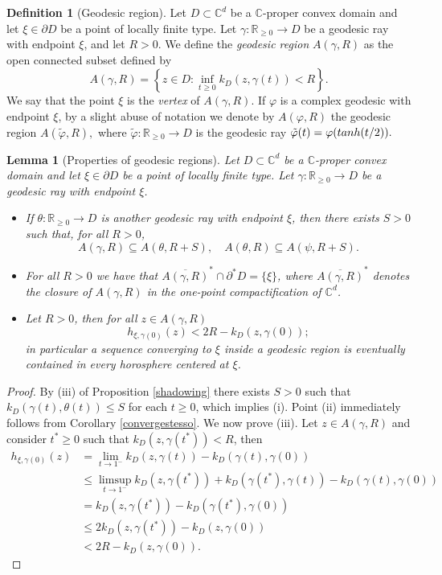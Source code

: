 \documentclass[11pt, reqno]{amsart}
\numberwithin{equation}{section}
\newtheorem{lemma}[theorem]{Lemma}
\theoremstyle{definition}
\newtheorem{definition}[theorem]{Definition}
\newcommand{\C}{\mathbb{C}}
\newcommand{\R}{\mathbb{R}}
\begin{document}
{		
		
		\begin{definition}[Geodesic region]
			Let $D\subset\C^d$ be a $\C$-proper convex domain and let $\xi\in\partial D$ be a point of locally finite type.
			Let $\gamma\colon \R_{\geq 0}\to D$ be a  geodesic ray with endpoint $\xi$, and let $R>0$.
			We define the {\sl geodesic region} $A(\gamma,R)$ as the open connected subset defined by
			$$A(\gamma,R)=\left\{z\in D: \inf_{t\geq0}k_D(z,\gamma(t))<R\right\}.$$
			We say that the point $\xi$ is the {\sl vertex} of $A(\gamma,R)$.
			If $\varphi$ is a complex geodesic with endpoint $\xi$, by a slight abuse of notation we denote
			by $A(\varphi,R)$ the geodesic region $A(\tilde \varphi,R),$ where
			$\tilde \varphi\colon \R_{\geq 0}\to D$ is the  geodesic ray $\tilde \varphi(t)=\varphi({\rm tanh}(t/2)).$
		\end{definition}
		
		\begin{lemma}[Properties of  geodesic regions]\label{kvshoro}
			Let $D\subset\C^d$ be a $\C$-proper convex domain and let $\xi\in\partial D$ be a point of locally finite type. Let $\gamma\colon \R_{\geq 0}\to D$ be a  geodesic ray with endpoint $\xi$.
			\begin{itemize}
				\item[(i)] If $\theta\colon \R_{\geq 0}\to D$ is another  geodesic ray with endpoint $\xi$, then there exists $S>0$ such that, for all $R>0$, 
				$$A(\gamma,R)\subseteq A(\theta, R+S), \quad A(\theta,R)\subseteq A(\psi, R+S).$$
				\item[(ii)] For all $R>0$ we have that  $\overline{A(\gamma, R)}^*\cap \partial^* D=\{\xi\}$,
				where $\overline{A(\gamma, R)}^*$ denotes the closure of $A(\gamma, R)$ in the one-point compactification of $\C^d$.
				\item[(iii)] Let $R>0$, then for all $z\in A(\gamma,R)$ $$h_{\xi,\gamma(0)}(z)<  2R-k_D(z,\gamma(0));$$
				in particular a sequence converging  to $\xi$ inside a geodesic region is eventually contained in every horosphere centered at $\xi$.
			\end{itemize}
		\end{lemma}
		\begin{proof}
			By (iii) of Proposition \ref{shadowing} there exists $S>0$ such that
			$k_D(\gamma(t),\theta(t))\leq S$ for each $t\geq0$, which implies (i). Point (ii) immediately follows from Corollary \ref{convergestesso}.
			We now prove (iii). Let $z\in A(\gamma,R)$ and consider $t^*\geq0$ such that $k_D(z,\gamma(t^*))<R$, then
			\begin{align*}h_{\xi,\gamma(0)}(z)&=\lim_{t\to1^-}k_D(z,\gamma(t))-k_D(\gamma(t),\gamma(0))\\&\leq\limsup_{t\to1^-} k_D(z,\gamma(t^*))+k_D(\gamma(t^*),\gamma(t))-k_D(\gamma(t),\gamma(0))\\&=  k_D(z,\gamma(t^*))-k_D(\gamma(t^*),\gamma(0))\\&\leq  2k_D(z,\gamma(t^*)) -k_D(z,\gamma(0))\\&<2R-k_D(z,\gamma(0)).
			\end{align*}
			

\end{proof}}
\end{document}
